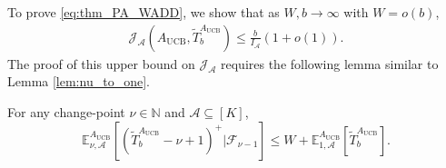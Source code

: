 \documentclass[letterpaper, 10 pt, conference]{ieeeconf}  %
\newcommand{\lp}{\left(}
\newcommand{\rp}{\right)}
\newcommand{\lb}{\left[}
\newcommand{\rb}{\right]}
\newcommand{\mcal}{\mathcal}
\newcommand{\mrm}{\mathrm}
\newcommand{\mbb}{\mathbb}
\newcommand{\E}{\mathbb{E}}
\begin{document}
To prove \eqref{eq:thm_PA_WADD}, we show that as $W, b \to \infty$ with $W = o(b)$,
%
\begin{align}\label{eq:UCB_CuSum_WADD_upp}
\mcal{J}_{\mcal{A}} \lp A_{\mrm{UCB}}, \tilde{T}_{b}^{A_{\mrm{UCB}}} \rp \leq \frac{b}{I_{\mcal{A}}}\lp 1 + o \lp 1 \rp \rp.
\end{align}
%
The proof of this upper bound on $\mcal{J}_{\mcal{A}}$ requires the following lemma similar to Lemma \ref{lem:nu_to_one}.

\begin{lemma}\label{lem:nu_to_one_PA}
For any change-point $\nu \in \mbb{N}$ and $\mcal{A} \subseteq \lb K \rb$,
\begin{equation}\label{eq:lem1}
    \E_{\nu,\mcal{A}}^{A_{\mrm{UCB}}} \lb \lp \tilde{T}_{b}^{A_{\mrm{UCB}}} - \nu + 1\rp^{+} \Big| \mcal{F}_{\nu-1} \rb \leq W + \E_{1,\mcal{A}}^{A_{\mrm{UCB}}} \lb \tilde{T}_{b}^{A_{\mrm{UCB}}} \rb.
\end{equation}
\end{lemma}
\end{document}
